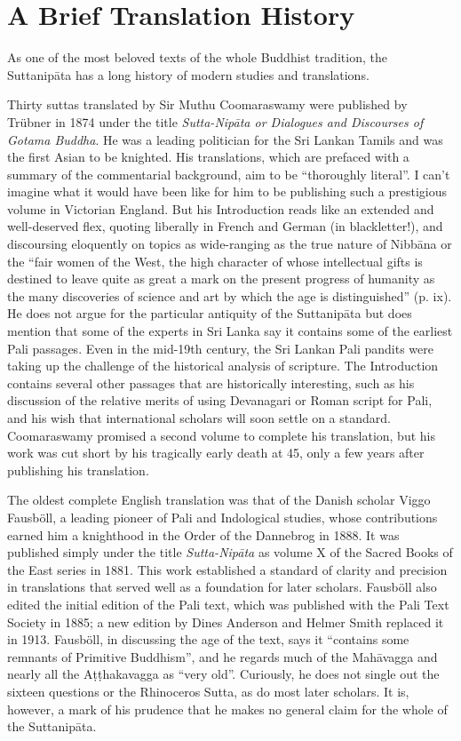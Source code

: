\documentclass[12pt,openany]{book}%
\begin{document}
\section*{A Brief Translation History}

As one of the most beloved texts of the whole Buddhist tradition, the \textsanskrit{Suttanipāta} has a long history of modern studies and translations.

Thirty suttas translated by Sir Muthu Coomaraswamy were published by Trübner in 1874 under the title \textit{Sutta-\textsanskrit{Nipāta} or Dialogues and Discourses of Gotama Buddha}. He was a leading politician for the Sri Lankan Tamils and was the first Asian to be knighted. His translations, which are prefaced with a summary of the commentarial background, aim to be “thoroughly literal”. I can’t imagine what it would have been like for him to be publishing such a prestigious volume in Victorian England. But his Introduction reads like an extended and well-deserved flex, quoting liberally in French and German (in blackletter!), and discoursing eloquently on topics as wide-ranging as the true nature of \textsanskrit{Nibbāna} or the “fair women of the West, the high character of whose intellectual gifts is destined to leave quite as great a mark on the present progress of humanity as the many discoveries of science and art by which the age is distinguished” (p. ix). He does not argue for the particular antiquity of the \textsanskrit{Suttanipāta} but does mention that some of the experts in Sri Lanka say it contains some of the earliest Pali passages. Even in the mid-19th century, the Sri Lankan Pali pandits were taking up the challenge of the historical analysis of scripture. The Introduction contains several other passages that are historically interesting, such as his discussion of the relative merits of using Devanagari or Roman script for Pali, and his wish that international scholars will soon settle on a standard. Coomaraswamy promised a second volume to complete his translation, but his work was cut short by his tragically early death at 45, only a few years after publishing his translation.

The oldest complete English translation was that of the Danish scholar Viggo Fausböll, a leading pioneer of Pali and Indological studies, whose contributions earned him a knighthood in the Order of the Dannebrog in 1888. It was published simply under the title \textit{Sutta-\textsanskrit{Nipāta}} as volume X of the Sacred Books of the East series in 1881. This work established a standard of clarity and precision in translations that served well as a foundation for later scholars. Fausböll also edited the initial edition of the Pali text, which was published with the Pali Text Society in 1885; a new edition by Dines Anderson and Helmer Smith replaced it in 1913. Fausböll, in discussing the age of the text, says it “contains some remnants of Primitive Buddhism”, and he regards much of the \textsanskrit{Mahāvagga} and nearly all the \textsanskrit{Aṭṭhakavagga} as “very old”. Curiously, he does not single out the sixteen questions or the Rhinoceros Sutta, as do most later scholars. It is, however, a mark of his prudence that he makes no general claim for the whole of the \textsanskrit{Suttanipāta}.
\end{document}
